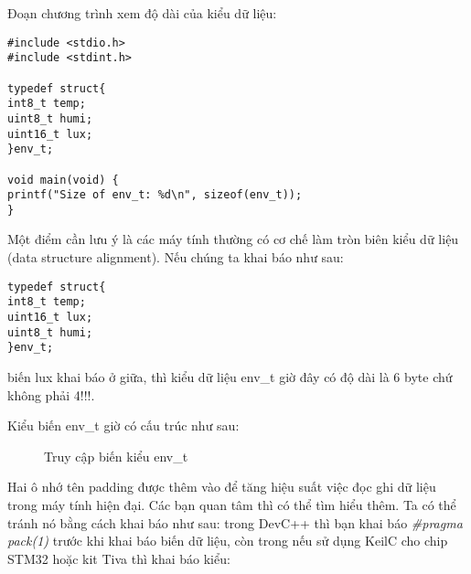 Đoạn chương trình xem độ dài của kiểu dữ liệu:
\begin{lstlisting}
#include <stdio.h>
#include <stdint.h>

typedef struct{
int8_t temp;
uint8_t humi;
uint16_t lux;
}env_t;

void main(void) {
printf("Size of env_t: %d\n", sizeof(env_t));
}
\end{lstlisting}

Một điểm cần lưu ý là các máy tính thường có cơ chế làm tròn biên kiểu dữ liệu (data structure alignment). Nếu chúng ta khai báo như sau:

\begin{lstlisting}
typedef struct{
int8_t temp;
uint16_t lux;
uint8_t humi;
}env_t;
\end{lstlisting}
biến lux khai báo ở giữa, thì kiểu dữ liệu env\_t giờ đây có độ dài là 6 byte chứ không phải 4!!!.

Kiểu biến env\_t giờ có cấu trúc như sau:
\begin{figure}[h!]
\centering
{}
\caption{Truy cập biến kiểu env\_t} 
\end{figure}

Hai ô nhớ tên padding được thêm vào để tăng hiệu suất việc đọc ghi dữ liệu trong máy tính hiện đại. Các bạn quan tâm thì có thể tìm hiểu thêm. Ta có thể tránh nó bằng cách khai báo như sau: trong DevC++ thì bạn khai báo \textit{\#pragma pack(1)} trước khi khai báo biến dữ liệu, còn trong nếu sử dụng KeilC cho chip STM32 hoặc kit Tiva thì khai báo kiểu:

